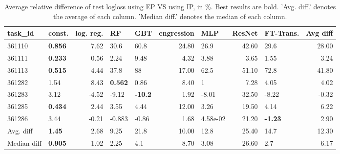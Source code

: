 \begin{table}[ht!]
\centering
\begingroup\footnotesize
\begin{tabular}{llrllrlrlr}
  \hline
\hline
task\_id & const. & log. reg. & RF & GBT & engression & MLP & ResNet & FT-Trans. & Avg diff \\ 
  \hline
361110 & \textbf{0.856} & 7.62 & 30.6 & 60.8 & 24.80 & 26.9 & 42.60 & 29.6 & 28.00 \\ 
  361111 & \textbf{0.233} & 0.56 & 2.24 & 9.48 & 4.32 & 3.88 & 3.65 & 1.55 & 3.24 \\ 
  361113 & \textbf{0.515} & 4.44 & 37.8 & 88 & 17.00 & 62.5 & 51.10 & 72.8 & 41.80 \\ 
  361282 & 1.54 & 8.43 & \textbf{0.562} & 0.86 & 8.40 & 1 & 7.28 & 4.05 & 4.02 \\ 
  361283 & 3.12 & -4.52 & -9.12 & \textbf{-10.2} & 1.92 & -8.01 & 32.50 & -8.22 & -0.32 \\ 
  361285 & \textbf{0.434} & 2.44 & 3.55 & 4.44 & 12.00 & 3.26 & 19.50 & 4.14 & 6.22 \\ 
  361286 & 3.44 & -0.21 & -0.883 & -0.86 & 1.68 & 4.58e-02 & 21.20 & \textbf{-1.23} & 2.90 \\ 
   \hline
Avg. diff & \textbf{1.45} & 2.68 & 9.25 & 21.8 & 10.00 & 12.8 & 25.40 & 14.7 & 12.30 \\ 
  Median diff & \textbf{0.905} & 1.02 & 2.25 & 4.1 & 8.70 & 3.08 & 26.60 & 2.7 & 6.17 \\ 
   \hline
\hline
\end{tabular}
\endgroup
\caption{Average relative difference of test logloss using EP VS using IP, in \%. 
                  Best results are bold. 
                  'Avg. diff.' denotes the average of each column.
                  'Median diff.' denotes the median of each column.} 
\label{TABLES/table_results_logloss_num_and_cat_features_EP_VS_IP}
\end{table}

